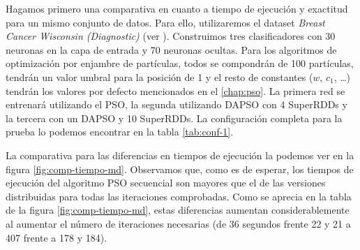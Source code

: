 \vspace{10pt}
Hagamos primero una comparativa en cuanto a tiempo de ejecución y exactitud para un mismo conjunto de datos. Para ello,
utilizaremos el dataset \textit{Breast Cancer Wisconsin (Diagnostic)} (ver \cite{cancer}). Construimos tres clasificadores 
con 30 neuronas en la capa de entrada y 70 neuronas ocultas. Para los algoritmos de optimización por enjambre de 
partículas, todos se compondrán de 100 partículas, tendrán un valor umbral para la posición de 1 y el resto de constantes
($w$, $c_1$, \dots) tendrán los valores por defecto mencionados en el \autoref{chap:pso}. La primera red se entrenará
utilizando el PSO, la segunda utilizando DAPSO con 4 SuperRDDs y la tercera con un DAPSO y 10 SuperRDDs. La configuración 
completa para la prueba lo podemos encontrar en la tabla \ref{tab:conf-1}.

\vspace{10pt}
La comparativa para las diferencias en tiempos de ejecución la podemos ver en la figura \ref{fig:comp-tiempo-md}.  Observamos que, como es de esperar, los tiempos de ejecución del algoritmo PSO secuencial son mayores que el de las versiones distribuidas para todas las iteraciones comprobadas. Como se aprecia en la tabla de la figura
\ref{fig:comp-tiempo-md}, estas diferencias aumentan considerablemente al aumentar el número de iteraciones necesarias
(de 36 segundos frente 22 y 21 a 407 frente a 178 y 184).

